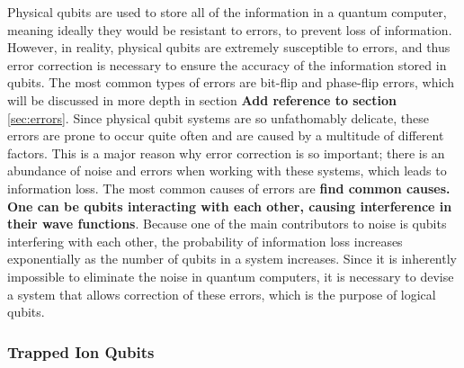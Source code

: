 \documentclass{article}
\begin{document}
Physical qubits are used to store all of the information in a quantum computer, meaning ideally they would be resistant to errors, to prevent loss of information. However, in 
reality, physical qubits are extremely susceptible to errors, and thus error correction is necessary to ensure the accuracy of the information stored in qubits. The most 
common types of errors are bit-flip and phase-flip errors, which will be discussed in more depth in section \textbf{Add reference to section} \ref{sec:errors}. Since physical
qubit systems are so unfathomably delicate, these errors are prone to occur quite often and are caused by a multitude of different factors. This is a major reason why error 
correction is so important; there is an abundance of noise and errors when working with these systems, which leads to information loss. The most common causes of
errors are \textbf{find common causes. One can be qubits interacting with each other, causing interference in their wave functions}. Because one of the main contributors to 
noise is qubits interfering with each other, the probability of information loss increases exponentially as the number of qubits in a system increases. Since it is inherently 
impossible to eliminate the noise in quantum computers, it is necessary to devise a system that allows correction of these errors, which is the purpose of logical qubits.



\subsubsection{Trapped Ion Qubits}
\label{sec:trappedionqubits}
\end{document}
